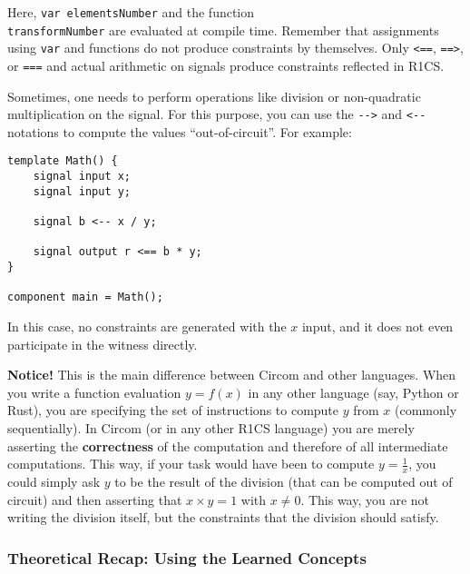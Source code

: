 \documentclass[../lecture-notes.tex]{subfiles}
\begin{document}
    Here, \texttt{var elementsNumber} and the function \\ \texttt{transformNumber}
    are evaluated at compile time. Remember that assignments using \texttt{var} and
    functions do not produce constraints by themselves. Only \texttt{<==},
    \texttt{==>}, or \texttt{===} and actual arithmetic on signals produce
    constraints reflected in R1CS.

    \begin{remark}
        Sometimes, one needs to perform operations like division or non-quadratic multiplication on the signal.
        For this purpose, you can use the \texttt{{-}->} and \texttt{<-{-}} notations to compute the values ``out-of-circuit''. For example:

        \begin{lstlisting}[language=Circom,numbers=none]
template Math() {
    signal input x;
    signal input y;

    signal b <-- x / y;

    signal output r <== b * y;
}

component main = Math();
        \end{lstlisting}\label{code:division-example}

        In this case, no constraints are generated with the $x$ input, and it does not even participate in the witness directly.

        \textcolor{green!50!black}{\textbf{Notice!}} This is the main difference between Circom and other languages. When you
        write a function evaluation $y = f(x)$ in any other language (say, Python or Rust),
        you are specifying the set of instructions to compute $y$ from $x$ (commonly
        sequentially). In Circom (or in any other R1CS language) you are merely asserting
        the \textbf{correctness} of the computation and therefore of all
        intermediate computations. This way, if your task would have been to compute
        $y = \frac{1}{x}$, you could simply ask $y$ to be the result of the division
        (that can be computed out of circuit) and then asserting that $x \times y = 1$
        with $x \neq 0$. This way, you are not writing the division itself, but
        the constraints that the division should satisfy.
    \end{remark}

    \subsubsection{Theoretical Recap: Using the Learned Concepts}
\end{document}
